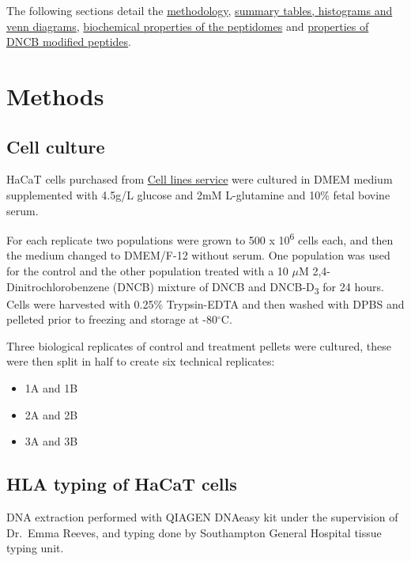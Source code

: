 \documentclass[12pt,]{book}
\providecommand{\tightlist}{%
  \setlength{\itemsep}{0pt}\setlength{\parskip}{0pt}}
\begin{document}
The following sections detail the
\protect\hyperlink{methods}{methodology},
\protect\hyperlink{peptidome-size-and-proportions}{summary tables,
histograms and venn diagrams},
\protect\hyperlink{peptide-binding-motifs}{biochemical properties of the
peptidomes} and \protect\hyperlink{dncb-modifications}{properties of
DNCB modified peptides}.

\hypertarget{methods}{\chapter{Methods}\label{methods}}

\hypertarget{cell-culture}{\section{Cell culture}\label{cell-culture}}

HaCaT cells \citep{boukamp1988} purchased from
\href{http://clsgmbh.de/}{Cell lines service} were cultured in DMEM
medium supplemented with 4.5g/L glucose and 2mM L-glutamine and 10\%
fetal bovine serum.

For each replicate two populations were grown to 500 x
10\textsuperscript{6} cells each, and then the medium changed to
DMEM/F-12 without serum. One population was used for the control and the
other population treated with a 10 \(\mu\)M 2,4-Dinitrochlorobenzene
(DNCB) mixture of DNCB and DNCB-D\textsubscript{3} for 24 hours. Cells
were harvested with 0.25\% Trypsin-EDTA and then washed with DPBS and
pelleted prior to freezing and storage at -80\(^\circ\)C.

Three biological replicates of control and treatment pellets were
cultured, these were then split in half to create six technical
replicates:

\begin{itemize}
\tightlist
\item
  1A and 1B
\item
  2A and 2B
\item
  3A and 3B
\end{itemize}

\section{HLA typing of HaCaT cells}\label{hla-typing-of-hacat-cells}

DNA extraction performed with QIAGEN DNAeasy kit under the supervision
of Dr.~Emma Reeves, and typing done by Southampton General Hospital
tissue typing unit.
\end{document}

